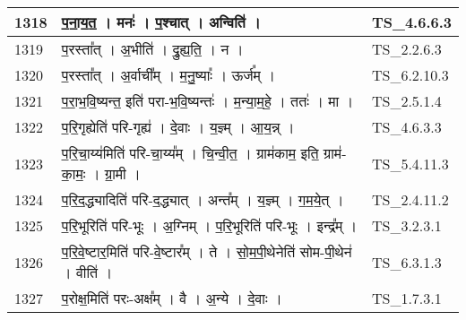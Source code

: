 \documentclass[17pt]{extarticle}
\begin{document}
\begin{longtable}{||p{0.4in}||p{4.9in}||p{0.9in}||}
    \hline
        
    1318 & प॒ना॒य॒त॒   ।   मनः॑   ।   प॒श्चात्   ।   अन्विति॑   ।    & TS\_4.6.6.3       \\
    
    \hline
        
    1319 & प॒रस्ता᳚त्   ।   अ॒भीति॑   ।   द्रु॒ह्य॒ति॒   ।   न   ।    & TS\_2.2.6.3       \\
    
    \hline
        
    1320 & प॒रस्ता᳚त्   ।   अ॒र्वाची᳚म्   ।   म॒नु॒ष्याः᳚   ।   ऊर्ज᳚म्   ।    & TS\_6.2.10.3       \\
    
    \hline
        
    1321 & प॒रा॒भ॒वि॒ष्यन्त॒ इति॑ परा{-}भ॒वि॒ष्यन्तः॑   ।   म॒न्या॒म॒हे॒   ।   ततः॑   ।   मा   ।    & TS\_2.5.1.4       \\
    
    \hline
        
    1322 & प॒रि॒गृह्येति॑ परि{-}गृह्य॑   ।   दे॒वाः   ।   य॒ज्ञ्म्   ।   आ॒य॒न्न्   ।    & TS\_4.6.3.3       \\
    
    \hline
        
    1323 & प॒रि॒चा॒य्य॑मिति॑ परि{-}चा॒य्य᳚म्   ।   चि॒न्वी॒त॒   ।   ग्राम॑काम॒ इति॒ ग्राम॑{-}का॒मः॒   ।   ग्रा॒मी   ।    & TS\_5.4.11.3       \\
    
    \hline
        
    1324 & प॒रि॒द॒द्ध्यादिति॑ परि{-}द॒द्ध्यात्   ।   अन्त᳚म्   ।   य॒ज्ञ्म्   ।   ग॒म॒ये॒त्   ।    & TS\_2.4.11.2       \\
    
    \hline
        
    1325 & प॒रि॒भूरिति॑ परि{-}भूः   ।   अ॒ग्निम्   ।   प॒रि॒भूरिति॑ परि{-}भूः   ।   इन्द्र᳚म्   ।    & TS\_3.2.3.1       \\
    
    \hline
        
    1326 & प॒रि॒वे॒ष्टार॒मिति॑ परि{-}वे॒ष्टार᳚म्   ।   ते   ।   सो॒म॒पी॒थेनेति॑ सोम{-}पी॒थेन॑   ।   वीति॑   ।    & TS\_6.3.1.3       \\
    
    \hline
        
    1327 & प॒रोक्ष॒मिति॑ परः{-}अक्ष᳚म्   ।   वै   ।   अ॒न्ये   ।   दे॒वाः   ।    & TS\_1.7.3.1       \\
    

\end{longtable}
\end{document}
